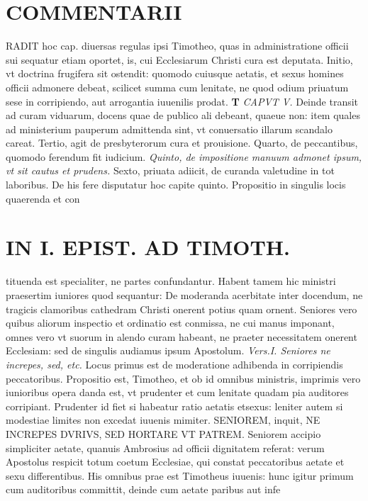 \documentclass{article}
\begin{document}
\begin{pages}
\section*{COMMENTARII }
\marginpar{[ p.116 ]}\pstart RADIT hoc cap. diuersas regulas ipsi Timotheo, quas in administratione officii sui sequatur etiam oportet, is, cui Ecclesiarum Christi cura est deputata. Initio, vt doctrina frugifera sit ostendit: quomodo cuiusque aetatis, et sexus homines officii admonere debeat, scilicet summa cum lenitate, ne quod odium priuatum sese in corripiendo, aut arrogantia iuuenilis prodat.  \pend
\textbf{T }
\textit{CAPVT V. }\pstart Deinde transit ad curam viduarum, docens quae de publico ali debeant, quaeue non: item quales ad ministerium pauperum admittenda sint, vt conuersatio illarum scandalo careat.  \pend\pstart Tertio, agit de presbyterorum cura et prouisione.  \pend\pstart Quarto, de peccantibus, quomodo ferendum fit iudicium.  \pend
\textit{Quinto, de impositione manuum admonet ipsum, vt sit cautus et prudens. }\pstart Sexto, priuata adiicit, de curanda valetudine in tot laboribus. De his fere disputatur hoc capite quinto.  \pend\pstart Propositio in singulis locis quaerenda et con  \pend
\section*{IN I. EPIST. AD TIMOTH. }
\marginpar{[ p.117 ]}\pstart tituenda est specialiter, ne partes confundantur. Habent tamem hic ministri praesertim iuniores quod sequantur: De moderanda acerbitate inter docendum, ne tragicis clamoribus  cathedram Christi onerent potius quam ornent. Seniores vero quibus aliorum inspectio et ordinatio est conmissa, ne cui manus imponant, omnes vero vt suorum in alendo curam habeant, ne praeter necessitatem onerent Ecclesiam: sed de singulis audiamus ipsum Apostolum.  \pend
\textit{Vers.I. Seniores ne increpes, sed, etc. }\pstart Locus primus est de moderatione adhibenda in corripiendis peccatoribus. Propositio est, Timotheo, et ob id omnibus ministris, imprimis vero iunioribus opera danda est, vt prudenter et cum lenitate quadam pia auditores corripiant. Prudenter id fiet si habeatur ratio aetatis etsexus: leniter autem si modestiae limites non excedat iuuenis mimiter.  \pend\pstart SENIOREM, inquit, NE INCREPES DVRIVS, SED HORTARE VT PATREM. Seniorem accipio simpliciter aetate, quanuis Ambrosius ad officii dignitatem referat: verum Apostolus respicit totum coetum Ecclesiae, qui constat peccatoribus aetate et sexu differentibus. His omnibus prae est Timotheus iuuenis: hunc igitur primum cum auditoribus committit, deinde cum aetate paribus aut infe\pend

\end{pages}
\end{document}

